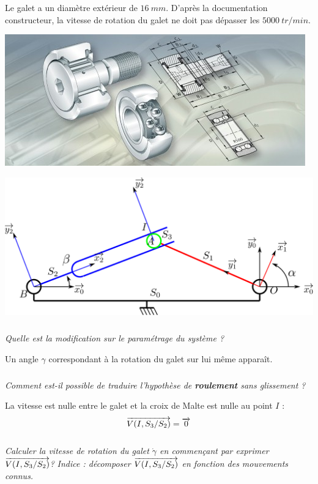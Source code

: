 \documentclass[10pt,fleqn]{article} %
\begin{document}
\begin{multicols}{2}
Le galet a un diamètre extérieur de $\SI{16}{mm}$. D'après la documentation constructeur, la vitesse de rotation du galet ne doit pas dépasser les $\SI{5000}{tr/min}$.

\begin{center}
 \includegraphics[width=\linewidth]{images/galet}
\end{center}


\begin{center}
 \includegraphics[width=.9\linewidth]{images/schema2}
\end{center}

\subparagraph{}
\textit{Quelle est la modification sur le paramétrage du système ?}
\ifprof%
\begin{corrige}

Un angle $\gamma$ correspondant à la rotation du galet sur lui même apparaît.

\end{corrige}
\else \fi

\subparagraph{}
\textit{Comment est-il possible de traduire l'hypothèse de \textbf{roulement} sans glissement ?}
\ifprof%
\begin{corrige}
La vitesse est nulle entre le galet et la croix de Malte est nulle au point $I$ :
$$ 
\overrightarrow{V(I,S_3/S_2)} = \overrightarrow{0}
$$
\end{corrige}\else\fi

\subparagraph{}
\textit{Calculer la vitesse de rotation du galet $\dot{\gamma}$ en commençant par exprimer $\overrightarrow{V(I,S_3/S_2)}$?}
\textit{Indice : décomposer $\overrightarrow{V(I,S_3/S_2)}$ en fonction des mouvements connus.}
\ifprof%
\begin{corrige}


\end{corrige}
\end{multicols}
\end{document}
